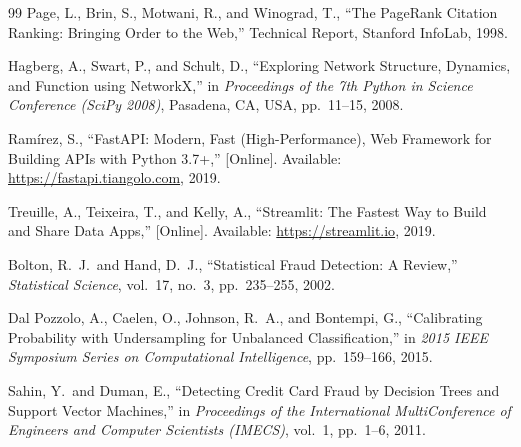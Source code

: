 \begin{thebibliography}{99}
Page, L., Brin, S., Motwani, R., and Winograd, T.,
``The PageRank Citation Ranking: Bringing Order to the Web,''
Technical Report, Stanford InfoLab, 1998.

Hagberg, A., Swart, P., and Schult, D.,
``Exploring Network Structure, Dynamics, and Function using NetworkX,''
in \textit{Proceedings of the 7th Python in Science Conference (SciPy 2008)},
Pasadena, CA, USA, pp.\ 11--15, 2008.

Ram\'irez, S.,
``FastAPI: Modern, Fast (High-Performance), Web Framework for Building APIs with Python 3.7+,''
[Online]. Available: \url{https://fastapi.tiangolo.com}, 2019.

Treuille, A., Teixeira, T., and Kelly, A.,
``Streamlit: The Fastest Way to Build and Share Data Apps,''
[Online]. Available: \url{https://streamlit.io}, 2019.

Bolton, R.\ J.\ and Hand, D.\ J.,
``Statistical Fraud Detection: A Review,''
\textit{Statistical Science},
vol.\ 17, no.\ 3, pp.\ 235--255, 2002.

Dal Pozzolo, A., Caelen, O., Johnson, R.\ A., and Bontempi, G.,
``Calibrating Probability with Undersampling for Unbalanced Classification,''
in \textit{2015 IEEE Symposium Series on Computational Intelligence},
pp.\ 159--166, 2015.

Sahin, Y.\ and Duman, E.,
``Detecting Credit Card Fraud by Decision Trees and Support Vector Machines,''
in \textit{Proceedings of the International MultiConference of Engineers and Computer Scientists (IMECS)},
vol.\ 1, pp.\ 1--6, 2011.

\end{thebibliography}
